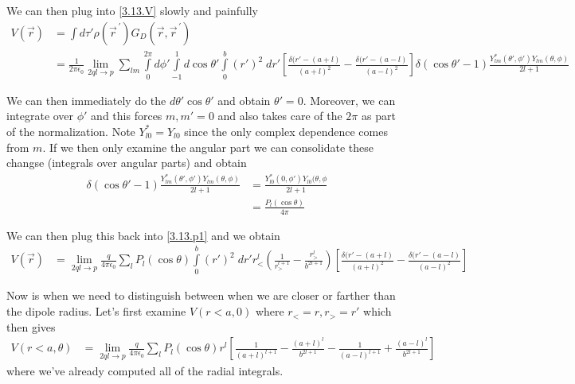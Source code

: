 \documentclass[10pt]{report}
\newcommand{\pvec}[1]{\vec{#1}^{\,\prime}}
\begin{document}
We can then plug into \eqref{3.13.V} slowly and painfully
\begin{align}
    V(\vec{r}) &= \int d\tau' \rho(\pvec{r})G_D(\vec{r}, \pvec{r})\\
    &=\frac{1}{2\pi\epsilon_0} \lim_{2ql \to p}\sum_{lm}^{}\displaystyle\int\limits_{0}^{2\pi}d\phi'\displaystyle\int\limits_{-1}^{1}d\cos\theta'\displaystyle\int\limits_{0}^{b}(r')^2\;dr'\left[ \frac{\delta(r' - (a + l)}{(a+l)^2} - \frac{\delta(r' - (a - l)}{(a - l)^2} \right]\delta(\cos\theta' - 1)\frac{Y_{lm}^*(\theta', \phi')Y_{lm}(\theta,\phi)}{2l+1}\label{3.13.p1}
\end{align}

We can then immediately do the $d\theta'\cos\theta'$ and obtain $\theta ' = 0$. Moreover, we can integrate over $\phi'$ and this forces $m,m' = 0$ and also takes care of the $2\pi$ as part of the normalization. Note $Y_{l0}^* = Y_{l0}$ since the only complex dependence comes from $m$. If we then only examine the angular part we can consolidate these changse (integrals over angular parts) and obtain
\begin{align}
    \delta(\cos\theta' - 1)\frac{Y_{lm}^*(\theta', \phi')Y_{lm}(\theta,\phi)}{2l+1} &= \frac{Y_{l0}^*(0,\phi')Y_{l0}(\theta,\phi}{2l+1}\\
    &= \frac{P_l(\cos\theta)}{4\pi}
\end{align}

We can then plug this back into \eqref{3.13.p1} and we obtain
\begin{align}
    V(\vec{r}) &= \lim_{2ql\to p} \frac{q}{4\pi\epsilon_0}\sum_{l}^{}P_l(\cos\theta)\displaystyle\int\limits_{0}^{b}(r')^2\;dr'r_<^l\left( \frac{1}{r_>^{l+1}} - \frac{r_>^l}{b^{2l+1}} \right)\left[ \frac{\delta(r' - (a + l)}{(a+l)^2} - \frac{\delta(r' - (a - l)}{(a - l)^2} \right]\label{3.13.pre}
\end{align}

Now is when we need to distinguish between when we are closer or farther than the dipole radius. Let's first examine $V(r < a, 0)$ where $r_< = r, r_> = r'$ which then gives
\begin{align}
    V(r < a, \theta) &= \lim_{2ql \to p}\frac{q}{4\pi\epsilon_0}\sum_{l}^{}P_l(\cos\theta) r^l\left[ \frac{1}{(a+l)^{l+1}} - \frac{\left( a+l \right)^l}{b^{2l+1}} - \frac{1}{(a-l)^{l+1}} + \frac{\left( a - l \right)^l}{b^{2l+1}} \right]
\end{align}
where we've already computed all of the radial integrals.
\end{document}
